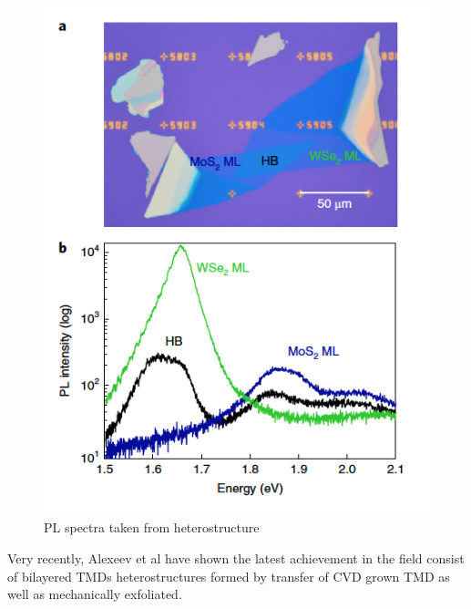 \begin{figure}[h]
	\begin{center}
		\includegraphics[scale=1]{Heterostructures/HeterostructurePLSpectrumInterlayerIntro.png}
		\caption{PL spectra taken from heterostructure \cite{Kunstmann2018}}
		\label{fig:HeterostructurePLSpectrumInterlayerIntro}
	\end{center}
\end{figure}

Very recently, Alexeev et al \cite{Alexeev2019} have shown the latest achievement in the field consist of bilayered TMDs heterostructures formed by transfer of CVD grown TMD as well as mechanically exfoliated.



